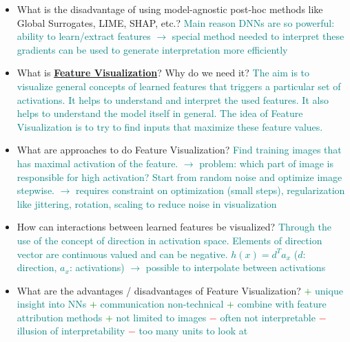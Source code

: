\documentclass{report}
\newcommand{\asw}[2][teal]{}
\renewcommand{\asw}[2][teal]{\textcolor{#1}{#2}}
\begin{document}
	\begin{itemize}
		\item What is the disadvantage of using model-agnostic post-hoc methods like Global Surrogates, LIME, SHAP, etc.?
		\asw{\newline Main reason DNNs are so powerful: ability to learn/extract features
			\newline $\rightarrow$ special method needed to interpret these
			\newline gradients can be used to generate interpretation more efficiently}
		
		\item What is \textbf{\underline{Feature Visualization}}? Why do we need it?
		\asw{\newline The aim is to visualize general concepts of learned features that triggers a particular set of activations.
			\newline It helps to understand and interpret the used features. It also helps to understand the model itself in general.
			\newline The idea of Feature Visualization is to try to find inputs that maximize these feature values.}
		\item What are approaches to do Feature Visualization?
		\asw{\newline Find training images that has maximal activation of the feature.
			\newline $\rightarrow$ problem: which part of image is responsible for high activation?
			\newline Start from random noise and optimize image stepwise.
			\newline $\rightarrow$ requires constraint on optimization (small steps), regularization like jittering, rotation, scaling to reduce noise in visualization}
		\item How can interactions between learned features be visualized?
		\asw{\newline Through the use of the concept of direction in activation space. Elements of direction vector are continuous valued and can be negative.
			\newline $h(x) = d^T a_x$ ($d$: direction, $a_x$: activations)
			\newline $\rightarrow$ possible to interpolate between activations}
		\item What are the advantages / disadvantages of Feature Visualization?
		\asw{\newline \textcolor{green}{$+$} unique insight into NNs
			\newline \textcolor{green}{$+$} communication non-technical
			\newline \textcolor{green}{$+$} combine with feature attribution methods
			\newline \textcolor{green}{$+$} not limited to images
			\newline \textcolor{red}{$-$} often not interpretable
			\newline \textcolor{red}{$-$} illusion of interpretability
			\newline \textcolor{red}{$-$} too many units to look at}
		

\end{itemize}
\end{document}
